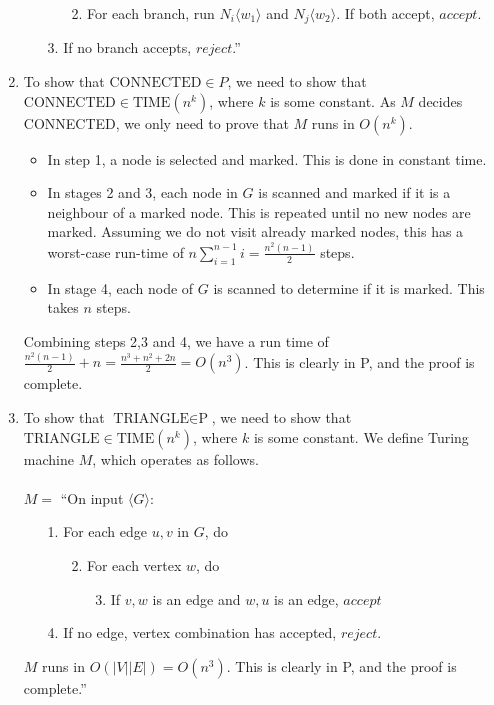 \documentclass[11pt]{article}
\begin{document}
\begin{enumerate}[7.1]
\begin{enumerate}
      \begin{enumerate}
        \item[2.] For each branch, run $N_i\langle w_1 \rangle$ and $N_j\langle w_2 \rangle$. If both accept, $accept$.
      \end{enumerate}
      \item[3.] If no branch accepts, $reject$.''
    \end{enumerate}
  \item To show that $\text{CONNECTED} \in P$, we need to show that $\text{CONNECTED} \in \text{TIME}(n^k)$, where $k$ is some constant. As $M$ decides CONNECTED, we only need to prove that $M$ runs in $O(n^k)$.
    \begin{itemize}
      \item In step 1, a node is selected and marked. This is done in constant time.
      \item In stages 2 and 3, each node in $G$ is scanned and marked if it is a neighbour of a marked node. This is repeated until no new nodes are marked. Assuming we do not visit already marked nodes, this has a worst-case run-time of $n \sum_{i=1}^{n-1} i = \frac{n^2(n - 1)}{2}$ steps.
      \item In stage 4, each node of $G$ is scanned to determine if it is marked. This takes $n$ steps.
    \end{itemize}
    Combining steps 2,3 and 4, we have a run time of $\frac{n^2(n-1)}{2} + n = \frac{n^3 + n^2 + 2n}{2} = O(n^3)$. This is clearly in P, and the proof is complete.
  \item To show that $\text{TRIANGLE} \in \text{P}$, we need to show that $\text{TRIANGLE} \in \text{TIME}(n^k)$, where $k$ is some constant. We define Turing machine $M$, which operates as follows.\\\\
    $M =$ ``On input $\langle G \rangle$:
    \begin{enumerate}
      \item[1.] For each edge $u, v$ in $G$, do
        \begin{enumerate}
        \item[2.] For each vertex $w$, do
          \begin{enumerate}
            \item[3.] If $v, w$ is an edge and $w, u$ is an edge, $accept$
          \end{enumerate}
        \end{enumerate}
      \item[4.] If no edge, vertex combination has accepted, $reject$.
    \end{enumerate}
    $M$ runs in $O(|V||E|) = O(n^3)$. This is clearly in P, and the proof is complete.''
\end{enumerate}
\end{document}
